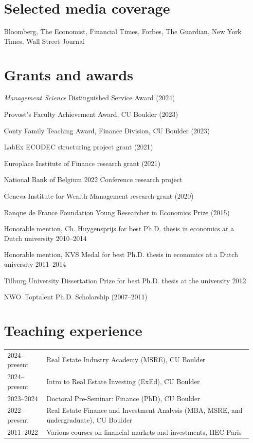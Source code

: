 \documentclass[a4paper]{article}
\begin{document}
\section*{Selected media coverage}

Bloomberg, The Economist, Financial Times, Forbes, The Guardian, New York Times, Wall Street Journal



\section*{Grants and awards}

{\em Management Science} Distinguished Service Award (2024)

Provost's Faculty Achievement Award, CU Boulder (2023)

Conty Family Teaching Award, Finance Division, CU Boulder (2023)

LabEx ECODEC structuring project grant (2021)

Europlace Institute of Finance research grant (2021) 

National Bank of Belgium 2022 Conference research project

Geneva Institute for Wealth Management research grant (2020)

Banque de France Foundation Young Researcher in Economics Prize (2015)

Honorable mention, Ch. Huygensprijs for best Ph.D. thesis in economics at a Dutch university 2010--2014

Honorable mention, KVS Medal for best Ph.D. thesis in economics at a Dutch university 2011--2014

Tilburg University Dissertation Prize for best Ph.D. thesis at the university 2012

NWO\ Toptalent Ph.D. Scholarship (2007--2011)



\section*{Teaching experience}

\begin{tabular}{p{2cm} p{14.7cm}}

2024--present & Real Estate Industry Academy (MSRE), CU Boulder\\[0.25cm]

2024--present & Intro to Real Estate Investing (ExEd), CU Boulder\\[0.25cm]

2023--2024 & Doctoral Pre-Seminar: Finance (PhD), CU Boulder\\[0.25cm]

2022--present & Real Estate Finance and Investment Analysis (MBA, MSRE, and undergraduate), CU Boulder\\[0.25cm]

2011--2022 & Various courses on financial markets and investments, HEC Paris
\end{tabular}
\end{document}
